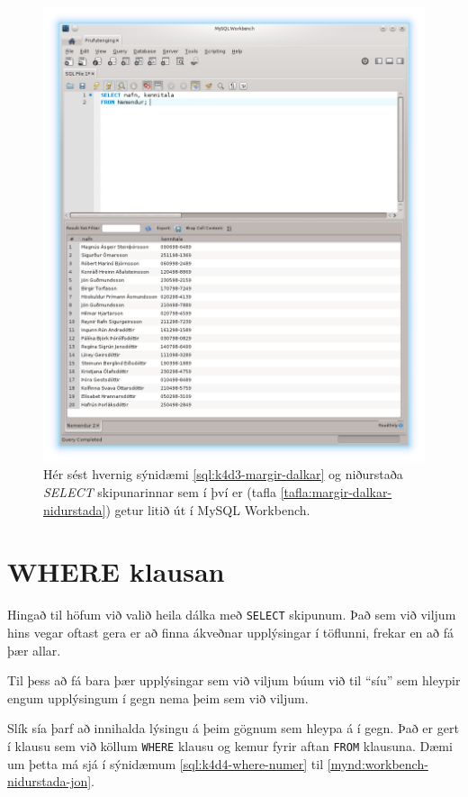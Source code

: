 \begin{figure}
\caption[Niðurstöður margra dálka SELECT í Workbench]{Hér sést hvernig sýnidæmi \ref{sql:k4d3-margir-dalkar} og niðurstaða \emph{SELECT} skipunarinnar sem í því er (tafla \ref{tafla:margir-dalkar-nidurstada}) getur litið út í MySQL Workbench.}
\label{mynd:workbench-nidurstada-margir-dalkar}
\centering
\includegraphics[width=\linewidth]{myndir/workbench-nidurstada-margir-dalkar}
\end{figure}

\newpage
\section{WHERE klausan}
Hingað til höfum við valið heila dálka með \verb|SELECT| skipunum. Það sem við viljum hins vegar oftast gera er að finna ákveðnar upplýsingar í töflunni, frekar en að fá þær allar.

Til þess að fá bara þær upplýsingar sem við viljum búum við til ``síu'' sem hleypir engum upplýsingum í gegn nema þeim sem við viljum.

Slík sía þarf að innihalda lýsingu á þeim gögnum sem hleypa á í gegn. Það er gert í klausu sem við köllum \verb|WHERE| klausu og kemur fyrir aftan \verb|FROM| klausuna. Dæmi um þetta má sjá í sýnidæmum \ref{sql:k4d4-where-numer} til \ref{mynd:workbench-nidurstada-jon}.

